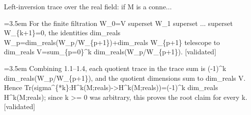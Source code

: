 \documentclass{article}
\newcommand{\step}[1]{\par\noindent\hangindent=3.5em\hangafter=1%
  \makebox[3.5em][l]{\textbf{#1.}}}
\newcommand{\steptag}[1]{\hfill{\small\textsf{[#1]}}}
\begin{document}
\begin{proofbox}{Left-inversion trace over the real field: if M is a conne...}
\step{1.4} For the finite filtration W\_0=V superset W\_1 superset ... superset W\_\{k+1\}=0, the identities dim\_reals W\_p=dim\_reals(W\_p/W\_\{p+1\})+dim\_reals W\_\{p+1\} telescope to dim\_reals V=sum\_\{p=0\}\textasciicircum{}k dim\_reals(W\_p/W\_\{p+1\}). \steptag{validated} \\[4pt]
\step{1.5} Combining 1.1--1.4, each quotient trace in the trace sum is (-1)\textasciicircum{}k dim\_reals(W\_p/W\_\{p+1\}), and the quotient dimensions sum to dim\_reals V. Hence Tr(sigma\textasciicircum{}\{*k\}:H\textasciicircum{}k(M;reals)->H\textasciicircum{}k(M;reals))=(-1)\textasciicircum{}k dim\_reals H\textasciicircum{}k(M;reals); since k >= 0 was arbitrary, this proves the root claim for every k. \steptag{validated} \\[4pt]
\end{proofbox}
\end{document}
